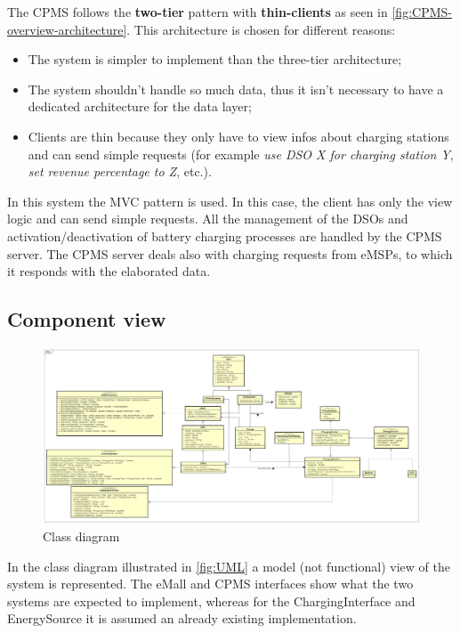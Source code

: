 The \ac{CPMS} follows the \textbf{two-tier} pattern with \textbf{thin-clients} as seen in \autoref{fig:CPMS-overview-architecture}. This architecture is chosen for different reasons:
\begin{itemize}
    \item The system is simpler to implement than the three-tier architecture;
    \item The system shouldn't handle so much data, thus it isn't necessary to have a dedicated architecture for the data layer;
    \item Clients are thin because they only have to view infos about charging stations and can send simple requests (for example \textit{use \ac{DSO} X for charging station Y}, \textit{set revenue percentage to Z}, etc.).
\end{itemize}
In this system the \ac{MVC} pattern is used. In this case, the client has only the view logic and can send simple requests. All the management of the \acp{DSO} and activation/deactivation of battery charging processes  are handled by the \ac{CPMS} server.
The \ac{CPMS} server deals also with charging requests from \acp{eMSP}, to which it responds with the elaborated data.

\subsection{Component view}
\begin{figure}[!h]
    \begin{center}
        \includegraphics[keepaspectratio, width=16cm]{../RASD/RASD/UML.png}
        \caption{Class diagram}
        \label{fig:UML}
    \end{center}
\end{figure}
In the class diagram illustrated in \autoref{fig:UML} a model (not functional) view of the system is represented. The \ac{eMall} and \ac{CPMS} interfaces show what the two systems are expected to implement, whereas for the ChargingInterface and EnergySource it is assumed an already existing implementation.

